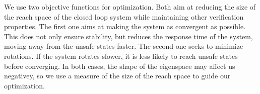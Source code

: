 \documentclass[sigconf]{llncs}
\begin{document}

We use two objective functions for optimization.  Both aim at reducing the
size of the reach space of the closed loop system while maintaining other
verification properties.  The first one aims at making the system as
convergent as possible.  This does not only ensure stability, but reduces
the response time of the system, moving away from the unsafe states faster.
The second one seeks to minimize rotations.  If the system rotates slower, it
is less likely to reach unsafe states before converging.
In both cases, the shape of the eigenspace may affect us negativey, so we
use a measure of the size of the reach space to guide our optimization.


%
\end{document}
